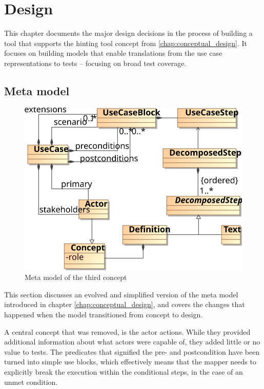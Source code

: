 \chapter{Design}
This chapter documents the major design decisions in the process of building a tool that supports the hinting tool concept from \ref{chap:conceptual_design}. It focuses on building models that enable translations from the use case representations to tests -- focusing on broad test coverage.

\section{Meta model}
\begin{figure}[!htbp]
  \centering
  \includegraphics[scale=0.9]{img/3rd_iteration_meta_model}
  \caption{Meta model of the third concept}
  \label{fig:3rd_iteration_meta_model}
\end{figure}
\noindent This section discusses an evolved and simplified version of the meta model introduced in chapter \ref{chap:conceptual_design}, and covers the changes that happened when the model transitioned from concept to design.\medskip

\noindent A central concept that was removed, is the actor actions. While they provided additional information about what actors were capable of, they added little or no value to tests. The predicates that signified the pre- and postcondition have been turned into simple use blocks, which effectively means that the mapper needs to explicitly break the execution within the conditional steps, in the case of an unmet condition.\medskip

